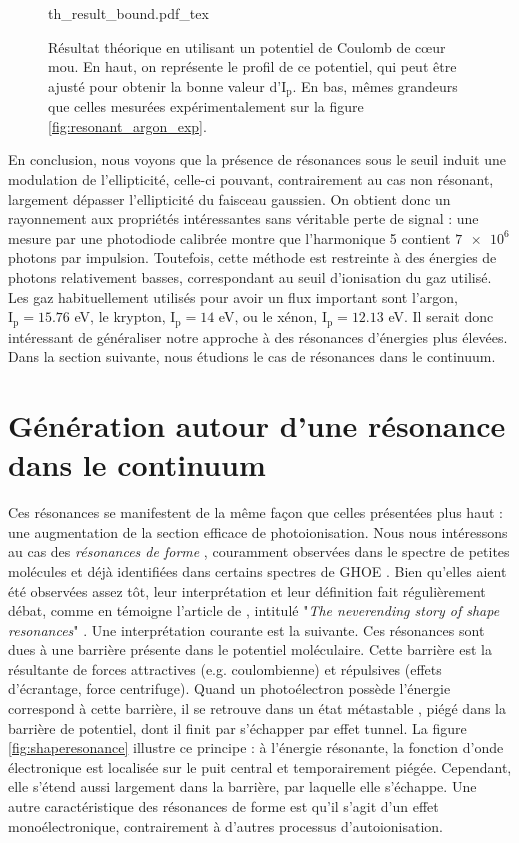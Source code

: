 \begin{figure}[!ht]
\centering
\def\svgwidth{1\columnwidth}
{th_result_bound.pdf_tex}
\caption{Résultat théorique en utilisant un potentiel de Coulomb de cœur mou. En haut, on représente le profil de ce potentiel, qui peut être ajusté pour obtenir la bonne valeur d'$\text{I}_{\text{p}}$. En bas, mêmes grandeurs que celles mesurées expérimentalement sur la figure \ref{fig:resonant_argon_exp}.}
\label{fig:resonant_argon_th_bound}
\end{figure}

En conclusion, nous voyons que la présence de résonances sous le seuil induit une modulation de l'ellipticité, celle-ci pouvant, contrairement au cas non résonant, largement dépasser l'ellipticité du faisceau gaussien. On obtient donc un rayonnement aux propriétés intéressantes sans véritable perte de signal : une mesure par une photodiode calibrée montre que l'harmonique 5 contient $\num{7e6}$ photons par impulsion. Toutefois, cette méthode est restreinte à des énergies de photons relativement basses, correspondant au seuil d'ionisation du gaz utilisé. Les gaz habituellement utilisés pour avoir un flux important sont l'argon, $\text{I}_{\text{p}}=15.76$ eV, le krypton, $\text{I}_{\text{p}}=14$ eV, ou le xénon, $\text{I}_{\text{p}}=12.13$ eV. Il serait donc intéressant de généraliser notre approche à des résonances d'énergies plus élevées. Dans la section suivante, nous étudions le cas de résonances dans le continuum.

\section{Génération autour d'une résonance dans le continuum}
Ces résonances se manifestent de la même façon que celles présentées plus haut : une augmentation de la section efficace de photoionisation. Nous nous intéressons au cas des \textit{résonances de forme} , couramment observées dans le spectre de petites molécules et déjà identifiées dans certains spectres de GHOE . Bien qu'elles aient été observées assez tôt, leur interprétation et leur définition fait régulièrement débat, comme en témoigne l'article de , intitulé "\textit{The neverending story of shape resonances}" . Une interprétation courante est la suivante. Ces résonances sont dues à une barrière présente dans le potentiel moléculaire. Cette barrière est la résultante de forces attractives (e.g. coulombienne) et répulsives (effets d'écrantage, force centrifuge). Quand un photoélectron possède l'énergie correspond à cette barrière, il se retrouve dans un état métastable , piégé dans la barrière de potentiel, dont il finit par s'échapper par effet tunnel. La figure \ref{fig:shaperesonance} illustre ce principe : à l'énergie résonante, la fonction d'onde électronique est localisée sur le puit central et temporairement piégée. Cependant, elle s'étend aussi largement dans la barrière, par laquelle elle s'échappe. Une autre caractéristique des résonances de forme est qu'il s'agit d'un effet monoélectronique, contrairement à d'autres processus d'autoionisation.

